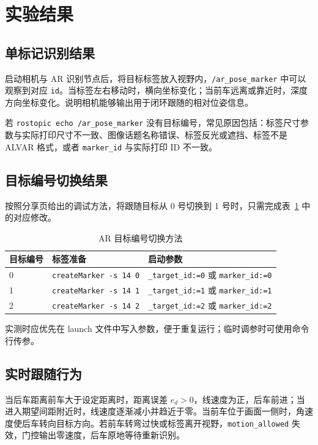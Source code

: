 \documentclass[UTF8,a4paper,12pt]{ctexart}
\begin{document}
	\section{实验结果}

	\subsection{单标记识别结果}
	启动相机与 AR 识别节点后，将目标标签放入视野内，\texttt{/ar\_pose\_marker} 中可以观察到对应 \texttt{id}。当标签左右移动时，横向坐标变化；当前车远离或靠近时，深度方向坐标变化。说明相机能够输出用于闭环跟随的相对位姿信息。

	若 \texttt{rostopic echo /ar\_pose\_marker} 没有目标编号，常见原因包括：标签尺寸参数与实际打印尺寸不一致、图像话题名称错误、标签反光或遮挡、标签不是 ALVAR 格式，或者 \texttt{marker\_id} 与实际打印 ID 不一致。

	\subsection{目标编号切换结果}
	按照分享页给出的调试方法，将跟随目标从 0 号切换到 1 号时，只需完成表~\ref{tab:id} 中的对应修改。

	\begin{table}[H]
		\centering
		\caption{AR 目标编号切换方法}
		\label{tab:id}
		\begin{tabular}{lll}
			\toprule
			目标编号 & 标签准备 & 启动参数 \\
			\midrule
			0 & \texttt{createMarker -s 14 0} & \texttt{\_target\_id:=0} 或 \texttt{marker\_id:=0} \\
			1 & \texttt{createMarker -s 14 1} & \texttt{\_target\_id:=1} 或 \texttt{marker\_id:=1} \\
			2 & \texttt{createMarker -s 14 2} & \texttt{\_target\_id:=2} 或 \texttt{marker\_id:=2} \\
			\bottomrule
		\end{tabular}
	\end{table}
	实测时应优先在 launch 文件中写入参数，便于重复运行；临时调参时可使用命令行传参。

	\subsection{实时跟随行为}
	当后车距离前车大于设定距离时，距离误差 \(e_d>0\)，线速度为正，后车前进；当进入期望间距附近时，线速度逐渐减小并趋近于零。当前车位于画面一侧时，角速度使后车转向目标方向。若前车转弯过快或标签离开视野，\texttt{motion\_allowed} 失效，门控输出零速度，后车原地等待重新识别。
\end{document}
